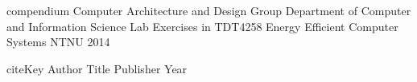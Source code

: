 \begin{thebibliography}{1}

{compendium} %
{Computer Architecture and Design Group Department of Computer and Information Science} %
{Lab Exercises in TDT4258 Energy Efficient Computer Systems} %
{NTNU} %
{2014} %

{citeKey} %
{Author} %
{Title} %
{Publisher} %
{Year} %

\end{thebibliography}